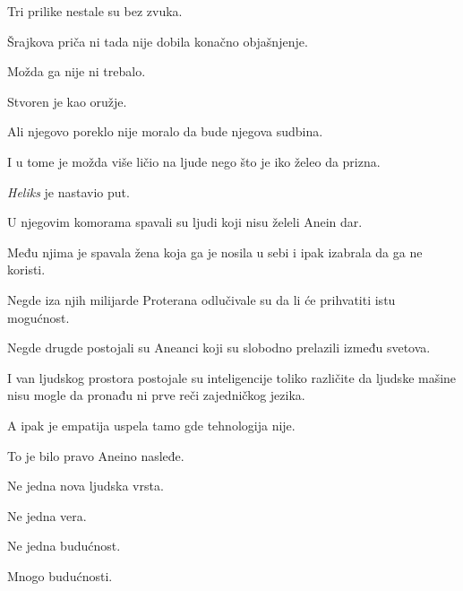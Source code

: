 \bigskip

Tri prilike nestale su bez zvuka.

\bigskip

Šrajkova priča ni tada nije dobila konačno objašnjenje.

\bigskip

Možda ga nije ni trebalo.

\bigskip

Stvoren je kao oružje.

\bigskip

Ali njegovo poreklo nije moralo da bude njegova sudbina.

\bigskip

I u tome je možda više ličio na ljude nego što je iko želeo da prizna.

\bigskip

\emph{Heliks} je nastavio put.

\bigskip

U njegovim komorama spavali su ljudi koji nisu želeli Anein dar.

\bigskip

Među njima je spavala žena koja ga je nosila u sebi i ipak izabrala da ga ne koristi.

\bigskip

Negde iza njih milijarde Proterana odlučivale su da li će prihvatiti istu mogućnost.

\bigskip

Negde drugde postojali su Aneanci koji su slobodno prelazili između svetova.

\bigskip

I van ljudskog prostora postojale su inteligencije toliko različite da ljudske mašine nisu mogle da pronađu ni prve reči zajedničkog jezika.

\bigskip

A ipak je empatija uspela tamo gde tehnologija nije.

\bigskip

To je bilo pravo Aneino nasleđe.

\bigskip

Ne jedna nova ljudska vrsta.

\bigskip

Ne jedna vera.

\bigskip

Ne jedna budućnost.

\bigskip

Mnogo budućnosti.

\bigskip

